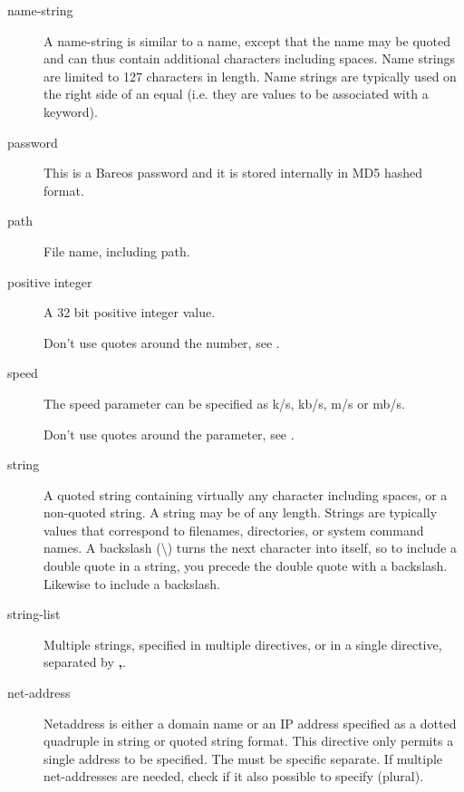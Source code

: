 \begin{description}
\item [name-string]
    \label{DataTypeNameString}
   A name-string is similar to a name,  except that the name may be quoted and
can thus contain  additional characters including spaces. Name strings  are
limited to 127 characters in length. Name strings  are typically used on the
right side of an equal (i.e.  they are values to be associated with a keyword).


\item [password]
    \label{DataTypePassword}
   This is a Bareos password and it is stored internally in MD5 hashed format.


\item [path]
    \label{DataTypePath}
    File name, including path.


\item [positive integer]
    \label{DataTypePositiveInteger}
   A 32 bit positive integer value.

   Don't use quotes around the number, see .


\item [speed]
    \label{DataTypeSpeed}
    The speed parameter can be specified as k/s, kb/s, m/s or mb/s.

    Don't use quotes around the parameter, see .


\item [string]
    \label{DataTypeString}
   A quoted string containing virtually any  character including spaces, or a
non-quoted string. A  string may be of any length. Strings are typically
values  that correspond to filenames, directories, or system  command names. A
backslash (\textbackslash{}) turns the next character into  itself, so to
include a double quote in a string, you precede the  double quote with a
backslash. Likewise to include a backslash.


\item [string-list]
    \label{DataTypeStringList}
    Multiple strings, specified in multiple directives, or in a single directive, separated by \textbf{,}.




\item [net-address]
    \label{DataTypeNetAddress}
Netaddress is either a domain name or an IP address specified as a
dotted quadruple in string or quoted string format.
This directive only permits a single address to be specified.
The \dtNetPort must be specific separate.
If multiple net-addresses are needed, check if it also possible to specify \dtNetAddresses (plural). 



\end{description}
